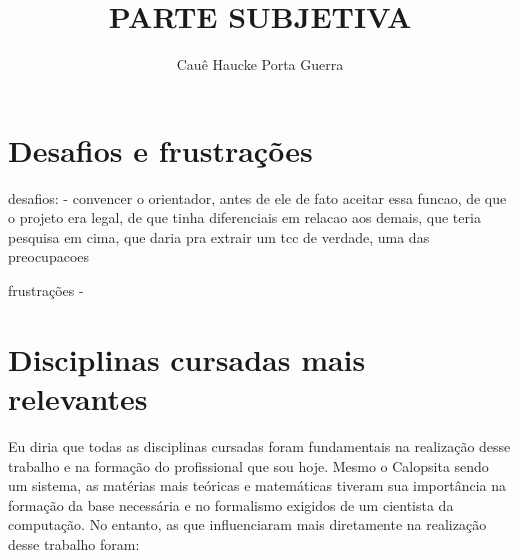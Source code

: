 \documentclass[titlepage,a4paper]{article}
\title{PARTE SUBJETIVA}
\author{Cauê Haucke Porta Guerra}
\newcommand{\calopsita}{Calopsita}
\begin{document}
\maketitle


\newpage
\section{Desafios e frustrações}
desafios:
- convencer o orientador, antes de ele de fato aceitar essa funcao, de que o projeto era legal, de que tinha diferenciais
em relacao aos demais, que teria pesquisa em cima, que daria pra extrair um tcc de verdade, uma das preocupacoes


frustrações
- 


\section{Disciplinas cursadas mais relevantes}

Eu diria que todas as disciplinas cursadas foram fundamentais na realização desse trabalho e na formação do profissional que sou hoje. Mesmo o \calopsita{} sendo um sistema, as matérias mais teóricas e matemáticas tiveram sua importância na formação da base necessária e no formalismo exigidos de um cientista da computação. No entanto, as que influenciaram mais diretamente na realização desse trabalho foram:
\end{document}
